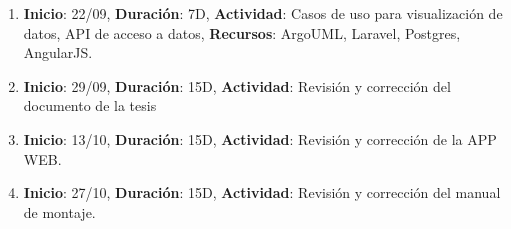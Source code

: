\documentclass[a4paper,11pt, spanish]{article}
\begin{document}
\begin{enumerate}
\item \textbf{Inicio}: 22/09, \textbf{Duración}: 7D, \textbf{Actividad}: Casos de uso para visualización de datos, API de acceso a datos, \textbf{Recursos}: ArgoUML, Laravel, Postgres, AngularJS.
\item \textbf{Inicio}: 29/09, \textbf{Duración}: 15D, \textbf{Actividad}: Revisión y corrección del documento de la tesis
\item \textbf{Inicio}: 13/10, \textbf{Duración}: 15D, \textbf{Actividad}: Revisión y corrección de la APP WEB.
\item \textbf{Inicio}: 27/10, \textbf{Duración}: 15D, \textbf{Actividad}: Revisión y corrección del manual de montaje.
\end{enumerate}
\end{document}
